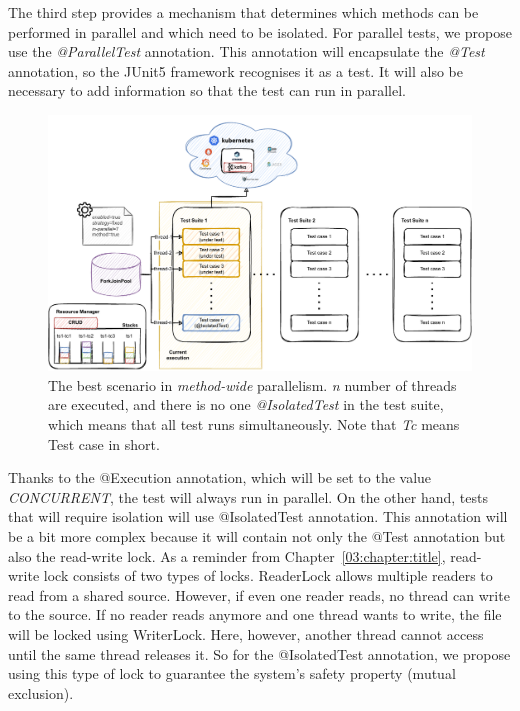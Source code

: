 The third step provides a mechanism that determines which methods can be performed in parallel and which need to be isolated.
For parallel tests, we propose use the \emph{@ParallelTest} annotation.
This annotation will encapsulate the \emph{@Test} annotation, so the JUnit5 framework recognises it as a test.
It will also be necessary to add information so that the test can run in parallel.
\begin{figure}[!ht]
    \centering
    \includegraphics[scale=0.8]{obrazky-figures/06-proposal-of-parallel-approach/04-method-wide}
    \caption{The best scenario in \emph{method-wide} parallelism. \emph{n} number of threads are executed, and there is no one \emph{@IsolatedTest} in the test suite, which means that all test runs simultaneously. Note that \emph{Tc} means Test case in short.}
    \label{05:fig:methodwideparallelism}
\end{figure}
Thanks to the @Execution annotation, which will be set to the value \emph{CONCURRENT}, the test will always run in parallel.
On the other hand, tests that will require isolation will use @IsolatedTest annotation.
This annotation will be a bit more complex because it will contain not only the @Test annotation but also the read-write lock.
As a reminder from Chapter~\ref{03:chapter:title}, read-write lock consists of two types of locks.
ReaderLock allows multiple readers to read from a shared source.
However, if even one reader reads, no thread can write to the source.
If no reader reads anymore and one thread wants to write, the file will be locked using WriterLock.
Here, however, another thread cannot access until the same thread releases it.
So for the @IsolatedTest annotation, we propose using this type of lock to guarantee the system's safety property (mutual exclusion).

